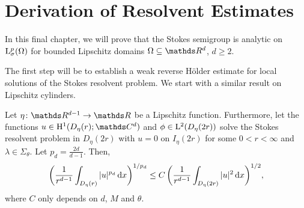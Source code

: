 \chapter{Derivation of Resolvent Estimates}

In this final chapter, we will prove that the Stokes semigroup is analytic on $\mathrm{L}^p_\sigma(\Omega)$ for bounded Lipschitz domains $\Omega \subseteq \R^d$, $d \geq 2$.

The first step will be to establish a weak reverse Hölder estimate for local solutions of the Stokes resolvent problem. 
We start with a similar result on Lipschitz cylinders.

\begin{lem}
  \label{lem:reverseHoelderCylinder}
  Let $\eta \colon \R^{d - 1} \to \R$ be a Lipschitz function.
  Furthermore, let the functions $u \in \HH^1(D_\eta(r); \C^d)$ and $\phi \in \mathrm{L}^2(D_\eta(2r))$ solve the Stokes resolvent problem in $D_\eta(2r)$ with $u = 0$ on $I_\eta(2r)$ for some $0 < r < \infty$ and $\lambda \in \Sigma_\theta$.
  Let $p_d = \frac{2d}{d - 1}$.
  Then,
  \begin{align}
    \label{eq:reverseHoelderCylinder}
    \bigg( \frac{1}{r^{d -1 }}\int_{D_\eta(r)} |u|^{p_d} \, {\operatorname{d}\!{x}} \bigg)^{1/p_d} \leq C \, \bigg( \frac{1}{r^{d - 1}} \int_{D_\eta(2r)} |u|^2 \, {\operatorname{d}\!{x}} \bigg)^{1/2},
  \end{align}
  where $C$ only depends on $d$, $M$ and $\theta$.
\end{lem}

